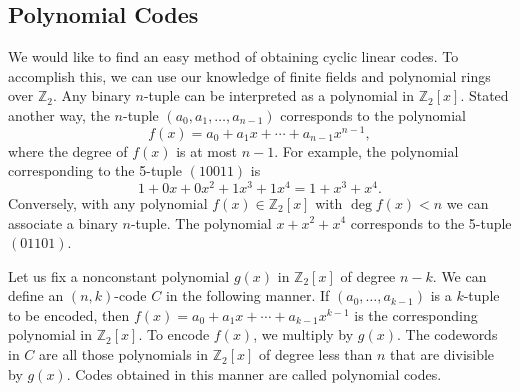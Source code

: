 \subsection*{Polynomial Codes}

We would like to find an easy method of obtaining cyclic linear codes.  To accomplish this, we can use our knowledge of finite fields and  polynomial rings over ${\mathbb Z}_2$.  Any binary $n$-tuple can be
interpreted as a polynomial in ${\mathbb Z}_2[x]$.  Stated another way, the $n$-tuple $(a_0, a_1, \ldots, a_{n-1} )$ corresponds to the polynomial
\[
f(x) = a_0 +  a_1 x +  \cdots + a_{n-1} x^{n-1},
\]
where the degree of $f(x)$ is at most $n-1$.   For example, the polynomial corresponding to the 5-tuple $(10011)$ is  
\[
1 + 0 x + 0 x^2 + 1 x^3 + 1 x^4 = 1 + x^3 + x^4.
\]
Conversely, with any polynomial $f(x) \in {\mathbb Z}_2[x]$ with $\deg f(x) < n$ we can associate a binary $n$-tuple.  The polynomial $x + x^2 + x^4$ corresponds to the 5-tuple $(01101)$.

Let us fix a nonconstant polynomial $g(x)$ in ${\mathbb Z}_2[x]$ of degree \mbox{$n - k$}.  We can define an $(n,k)$-code $C$ in the following manner.  If $(a_0, \ldots, a_{k-1})$ is a $k$-tuple to be encoded, then $f(x) = a_0 + a_1 x +  \cdots + a_{k-1} x^{k-1}$ is the corresponding polynomial
in ${\mathbb Z}_2[x]$.  To encode $f(x)$, we multiply by $g(x)$.  The codewords in $C$ are all those polynomials in ${\mathbb Z}_2[x]$ of degree less than  $n$ that are divisible by $g(x)$.  Codes obtained in this manner are called {\bfi polynomial codes}.  


